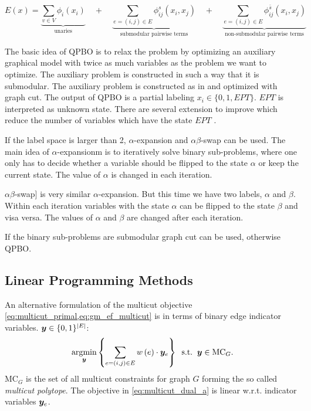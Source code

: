 \begin{equation} \label{eq:gm_qpbo_energy}
    E(x) = 
    \underbrace{
        \sum_{v \in V} \phi_i(x_i)
    }_{\text{unaries}}
    \quad +  \quad
    \underbrace{
        \sum_{e=(i,j) \in E } \phi^{s}_{ij}(x_i,x_j)
    }_{\text{submodular pairwise terms}}
    \quad +  \quad
    \underbrace{
        \sum_{e=(i,j) \in E } \phi^{\bar{s}}_{ij}(x_i,x_j)
    }_{\text{non-submodular pairwise terms}}
\end{equation}

The basic idea of QPBO is to relax the problem by optimizing an auxiliary graphical
model with twice as much variables as the problem we want to optimize. The
auxiliary problem is constructed in such a way that it is submodular. The
auxiliary problem is constructed as in \cite{rother_2007_cvpr} and optimized with graph cut. 
The output of QPBO
is a partial labeling $x_i \in \{ 0,1, EPT \}$. $EPT$ is interpreted as unknown state. There are several
extension to improve which reduce the number
of variables which have the state $EPT$ .


If the label space is larger than 2, $\alpha$-expansion and $\alpha \beta$-swap \cite{boykov_2001_pami} can be used.
The main idea of $\alpha$-expansionm is to iteratively
solve binary sub-problems, where one only has to decide whether a variable should be
flipped to the state $\alpha$ or keep the current state. The value of $\alpha$ is changed in each iteration.

$\alpha \beta$-swap] is very similar  $\alpha$-expansion.
But this time we have two labels, $\alpha$ and $\beta$. Within each iteration variables
with the state $\alpha$ can be flipped to the state $\beta$ and visa versa. The values of $\alpha$ and $\beta$
are changed after each iteration.

If the binary sub-problems are submodular graph cut can be used, otherwise QPBO.



\subsection{Linear Programming Methods}



An alternative formulation of the multicut objective \cref{eq:multicut_primal,eq:gm_ef_multicut} 
is in terms of binary edge indicator variables.
$\boldsymbol y \in \{0,1\}^{| E |}$:
\begin{align}
\argmin_{\y}
%
\left\{
    \sum_{e=(i,j) \in E} \w \left(e\right) \cdot \y_{e}
\right\}%
%
\;\;\text{s.t.}\;\;\y \in \MC_G.
\label{eq:multicut_dual_a}
\end{align}
%
%
$\text{MC}_G$ is the set of all multicut
constraints \cite{chopra_1993_mp} for graph $G$ forming
the so called \emph{multicut polytope}.
The objective in \cref{eq:multicut_dual_a}
is linear w.r.t. indicator variables $\boldsymbol y_{e}$.

